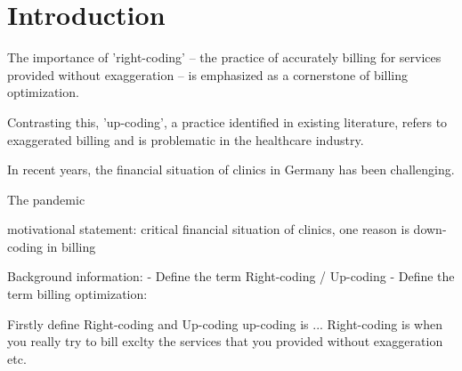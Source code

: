 \chapter{Introduction}\label{ch:introduction}




The importance of 'right-coding' – the practice of accurately billing for services provided without exaggeration – is emphasized as a cornerstone of billing optimization.


Contrasting this, 'up-coding', a practice identified in existing literature, refers to exaggerated billing and is problematic in the healthcare industry.


In recent years, the financial situation of clinics in Germany has been challenging.

The pandemic

%





motivational statement: critical financial situation of clinics, one reason is down-coding in billing

Background information:
- Define the term Right-coding / Up-coding
- Define the term billing optimization:

Firstly define Right-coding and Up-coding
up-coding is ... \cite{coustasse2021upcoding}
Right-coding is when you really try to bill exclty the services that you provided without exaggeration etc.

